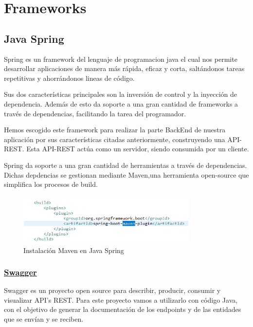      \section{Frameworks}
     
     \subsection{Java Spring}
     Spring es un framework del lenguaje de programacion java el cual nos permite desarrollar aplicaciones de manera más rápida, eficaz y corta, saltándonos tareas repetitivas y ahorrándonos lineas de código\cite{javaspring}.
     \newline
     
     Sus dos características principales son la inversión de control y la inyección de dependencia. Además de esto da soporte a una gran cantidad de frameworks a través de dependencias, facilitando la tarea del programador.
     \newline
     
     Hemos escogido este framework para realizar la parte BackEnd de nuestra aplicación por sus características citadas anteriormente, construyendo una API-REST. Esta API-REST actúa como un servidor, siendo consumida por un cliente.
     \newline
    
    Spring da soporte a una gran cantidad de herramientas a través de dependencias. Dichas depdencias se gestionan mediante Maven,una herramienta open-source que simplifica los procesos de build.
    
    \begin{figure}[h]
    \centering
    \includegraphics[width=0.8\textwidth]{images/maven}
    \caption{Instalación Maven en Java Spring}
    \end{figure}
    
    

        \subsubsection{\underline{Swagger}}
        Swagger es un proyecto open source para describir, producir, consumir y visualizar API’s REST. Para este proyecto vamos a utilizarlo con código Java, con el objetivo de generar la documentación de los endpoints y de las entidades que se envían y se reciben.

